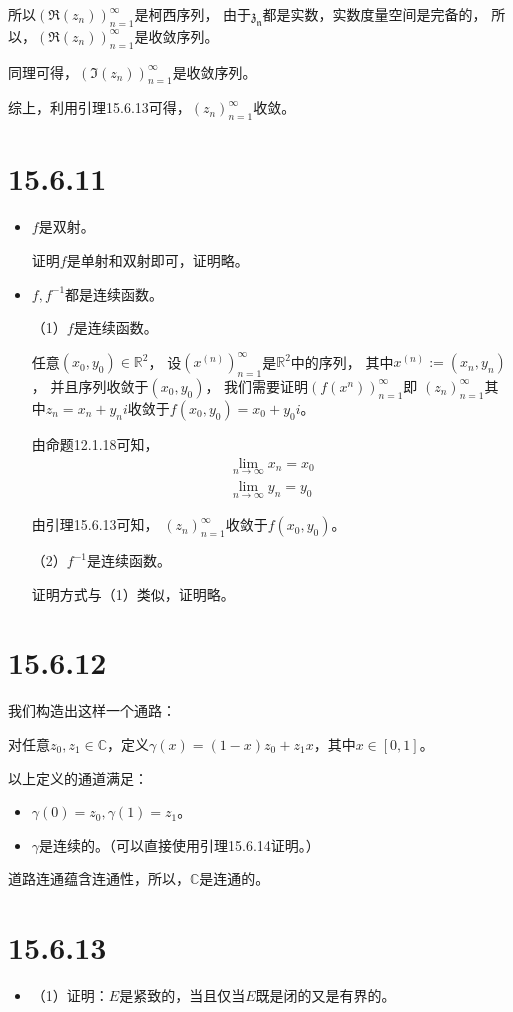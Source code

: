\documentclass{article}
\begin{document}
所以$(\mathfrak{R}(z_n))_{n = 1}^\infty$是柯西序列，
由于$\mathfrak{z_n}$都是实数，实数度量空间是完备的，
所以，$(\mathfrak{R}(z_n))_{n = 1}^\infty$是收敛序列。

同理可得，$(\mathfrak{I}(z_n))_{n = 1}^\infty$是收敛序列。

综上，利用引理15.6.13可得，$(z_n)_{n = 1}^\infty$收敛。

\section*{15.6.11}

\begin{itemize}
  \item $f$是双射。

        证明$f$是单射和双射即可，证明略。

  \item $f, f^{-1}$都是连续函数。

        （1）$f$是连续函数。

        任意$(x_0, y_0) \in \mathbb{R}^2$，
        设$(x^{(n)})_{n = 1}^\infty$是$\mathbb{R}^2$中的序列，
        其中$x^{(n)} := (x_n, y_n)$，
        并且序列收敛于$(x_0, y_0)$，
        我们需要证明$(f(x^{n}))_{n = 1}^\infty$即
        $(z_n)_{n = 1}^\infty$其中$z_n = x_n + y_n i$收敛于$f(x_0, y_0) = x_0 + y_0 i$。

        由命题12.1.18可知，
        \begin{align*}
          \lim\limits_{n \to \infty} x_n = x_0 \\
          \lim\limits_{n \to \infty} y_n = y_0
        \end{align*}

        由引理15.6.13可知，
        $(z_n)_{n = 1}^\infty$收敛于$f(x_0, y_0)$。

        （2）$f^{-1}$是连续函数。

        证明方式与（1）类似，证明略。

\end{itemize}


\section*{15.6.12}

我们构造出这样一个通路：

对任意$z_0, z_1 \in \mathbb{C}$，定义$\gamma (x) = (1 - x)z_0 + z_1 x$，其中$x \in [0, 1]$。

以上定义的通道满足：

\begin{itemize}
  \item $\gamma (0) = z_0, \gamma (1) = z_1$。
  \item $\gamma$是连续的。（可以直接使用引理15.6.14证明。）
\end{itemize}

道路连通蕴含连通性，所以，$\mathbb{C}$是连通的。

\section*{15.6.13}

\begin{itemize}
  \item （1）证明：$E$是紧致的，当且仅当$E$既是闭的又是有界的。


\end{itemize}
\end{document}
